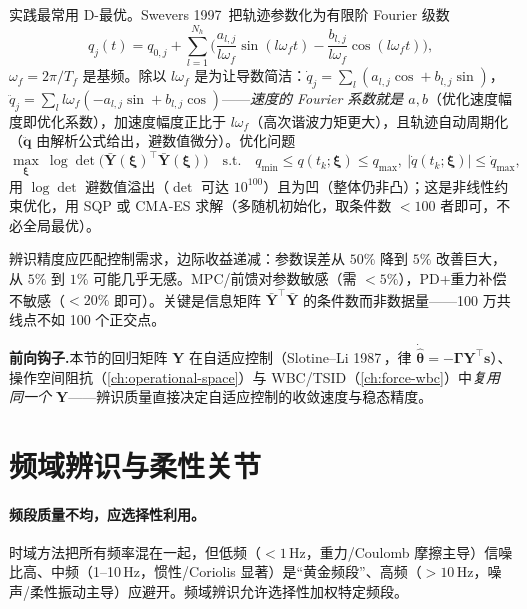 实践最常用 D-最优。Swevers 1997\,\cite{swevers1997optimal} 把轨迹参数化为有限阶 Fourier 级数
\begin{equation}
  q_j(t)=q_{0,j}+\sum_{l=1}^{N_h}\Big(\frac{a_{l,j}}{l\omega_f}\sin(l\omega_f t)-\frac{b_{l,j}}{l\omega_f}\cos(l\omega_f t)\Big),
  \label{eq:fourier-traj}
\end{equation}
$\omega_f=2\pi/T_f$ 是基频。除以 $l\omega_f$ 是为让导数简洁：$\dot q_j=\sum_l(a_{l,j}\cos+b_{l,j}\sin)$，$\ddot q_j=\sum_l l\omega_f(-a_{l,j}\sin+b_{l,j}\cos)$——\emph{速度的 Fourier 系数就是 $a,b$}（优化速度幅度即优化系数），加速度幅度正比于 $l\omega_f$（高次谐波力矩更大），且轨迹自动周期化（$\ddot{\mathbf q}$ 由解析公式给出，避数值微分）。优化问题
\begin{equation}
  \max_{\boldsymbol\xi}\ \log\det\big(\bar{\mathbf Y}(\boldsymbol\xi)^\top\bar{\mathbf Y}(\boldsymbol\xi)\big)
  \quad\text{s.t.}\quad q_{\min}\le q(t_k;\boldsymbol\xi)\le q_{\max},\ |\dot q(t_k;\boldsymbol\xi)|\le\dot q_{\max},
\end{equation}
用 $\log\det$ 避数值溢出（$\det$ 可达 $10^{100}$）且为凹（整体仍非凸）；这是非线性约束优化，用 SQP 或 CMA-ES 求解（多随机初始化，取条件数 $<100$ 者即可，不必全局最优）。

\begin{insight}
辨识精度应匹配控制需求，边际收益递减：参数误差从 $50\%$ 降到 $5\%$ 改善巨大，从 $5\%$ 到 $1\%$ 可能几乎无感。MPC/前馈对参数敏感（需 $<5\%$），PD+重力补偿不敏感（$<20\%$ 即可）。关键是信息矩阵 $\bar{\mathbf Y}^\top\bar{\mathbf Y}$ 的条件数而非数据量——100 万共线点不如 100 个正交点。
\end{insight}

\noindent\textbf{前向钩子.}\;本节的回归矩阵 $\mathbf Y$ 在自适应控制（Slotine--Li 1987\,\cite{slotineli1987adaptive}，律 $\dot{\hat{\boldsymbol\theta}}=-\boldsymbol\Gamma\mathbf Y^\top\mathbf s$）、操作空间阻抗（\cref{ch:operational-space}）与 WBC/TSID（\cref{ch:force-wbc}）中\emph{复用同一个 $\mathbf Y$}——辨识质量直接决定自适应控制的收敛速度与稳态精度。

\section{频域辨识与柔性关节}
\label{sec:freq-id}

\paragraph{频段质量不均，应选择性利用。}
时域方法把所有频率混在一起，但低频（$<1\,$Hz，重力/Coulomb 摩擦主导）信噪比高、中频（1--10\,Hz，惯性/Coriolis 显著）是“黄金频段”、高频（$>10\,$Hz，噪声/柔性振动主导）应避开。频域辨识允许选择性加权特定频段。

